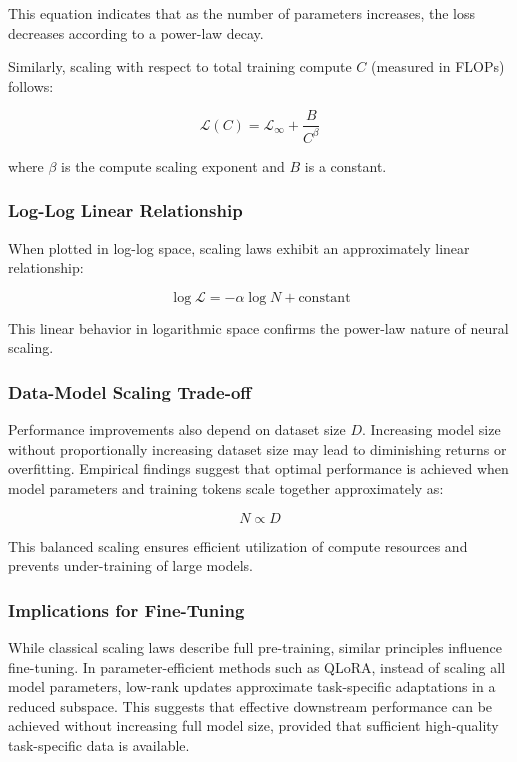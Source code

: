 This equation indicates that as the number of parameters increases, the loss decreases according to a power-law decay.

Similarly, scaling with respect to total training compute $C$ (measured in FLOPs) follows:

\begin{equation}
\mathcal{L}(C) = \mathcal{L}_{\infty} + \frac{B}{C^{\beta}}
\end{equation}

where $\beta$ is the compute scaling exponent and $B$ is a constant.

\subsubsection{Log-Log Linear Relationship}

When plotted in log-log space, scaling laws exhibit an approximately linear relationship:

\begin{equation}
\log \mathcal{L} = -\alpha \log N + \text{constant}
\end{equation}

This linear behavior in logarithmic space confirms the power-law nature of neural scaling.

\subsubsection{Data-Model Scaling Trade-off}

Performance improvements also depend on dataset size $D$. Increasing model size without proportionally increasing dataset size may lead to diminishing returns or overfitting. Empirical findings suggest that optimal performance is achieved when model parameters and training tokens scale together approximately as:

\begin{equation}
N \propto D
\end{equation}

This balanced scaling ensures efficient utilization of compute resources and prevents under-training of large models.

\subsubsection{Implications for Fine-Tuning}

While classical scaling laws describe full pre-training, similar principles influence fine-tuning. In parameter-efficient methods such as QLoRA, instead of scaling all model parameters, low-rank updates approximate task-specific adaptations in a reduced subspace. This suggests that effective downstream performance can be achieved without increasing full model size, provided that sufficient high-quality task-specific data is available.

